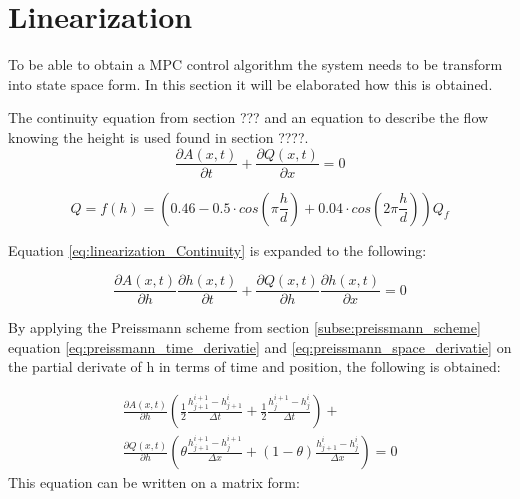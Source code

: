 \section{Linearization}\label{se:linearization}
To be able to obtain a MPC control algorithm the system needs to be transform into state space form. In this section it will be elaborated how this is obtained.


The continuity equation from section ??? and an equation to describe the flow knowing the height is used found in section ????. 
\begin{equation}\label{eq:linearization_Continuity}
\frac{\partial A(x,t)}{\partial t} + \frac{\partial Q(x,t)}{\partial x}=0
\end{equation}

\begin{equation}
	Q = f(h) = \left(0.46-0.5 \cdot cos\left(\pi \frac{h}{d}\right)+0.04\cdot cos\left(2\pi\frac{h}{d}\right)\right)Q_f
\end{equation}

Equation \ref{eq:linearization_Continuity} is expanded to the following:

\begin{equation}
	\frac{\partial A(x,t)}{\partial h}\frac{\partial h(x,t)}{\partial t} + \frac{\partial Q(x,t)}{\partial h}\frac{\partial h(x,t)}{\partial x}=0
\end{equation}

By applying the Preissmann scheme from section \ref{subse:preissmann_scheme} equation \ref{eq:preissmann_time_derivatie} and \ref{eq:preissmann_space_derivatie} on the partial derivate of h in terms of time and position, the following is obtained: 

\begin{multline}
	\frac{\partial A(x,t)}{\partial h} \left(\frac{1}{2}\frac{h_{j+1}^{i+1}-h_{j+1}^i}{\Delta t} +  \frac{1}{2} \frac{h_{j}^{i+1} - h_j^i}{\Delta t}\right) + \\ \frac{\partial Q(x,t)}{\partial h}\left(\theta \frac{h_{j+1}^{i+1}-h_j^{i+1}}{\Delta x}+(1-\theta)\frac{h_{j+1}^i - h_j^i}{\Delta x}\right)=0
\end{multline}
This equation can be written on a matrix form:

